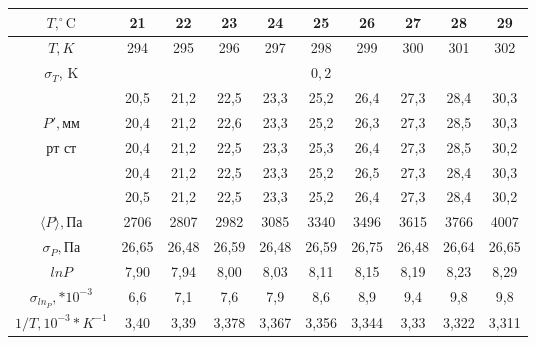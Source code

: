 \documentclass[a4paper,12pt]{article} %
\begin{document}
\begin{tabular}{|c|c|c|c|c|c|c|c|c|c|}
\hline 
$T, ^\circ \text{C}$ & 21 & 22 & 23 & 24 & 25 & 26 & 27 & 28 & 29 \\ 
\hline 
$T, K$ & 294 & 295 & 296 & 297 & 298 & 299 & 300 & 301 & 302 \\ 
\hline 
$\sigma_T$, K & \multicolumn{9}{c|}{$0,2$} \\ 
\hline 
 & 20,5 & 21,2 & 22,5 & 23,3 & 25,2 & 26,4 & 27,3 & 28,4 & 30,3 \\ 
\hhline{~---------} 
$P', \text{мм}$ & 20,4 & 21,2 & 22,6 & 23,3 & 25,2 & 26,3 & 27,3 & 28,5 & 30,3 \\ 
\hhline{~---------}  
$\text{рт ст}$ & 20,4 & 21,2 & 22,5 & 23,3 & 25,3 & 26,4 & 27,3 & 28,5 & 30,2 \\ 
\hhline{~---------} 
 & 20,4 & 21,2 & 22,5 & 23,3 & 25,2 & 26,5 & 27,3 & 28,4 & 30,3 \\ 
\hhline{~---------} 
 & 20,5 & 21,2 & 22,5 & 23,3 & 25,2 & 26,4 & 27,3 & 28,4 & 30,2 \\ 
\hline 
$\langle P \rangle, \text{Па} $ & 2706 & 2807 & 2982 & 3085 & 3340 & 3496 & 3615 & 3766 & 4007 \\ 
\hline 
$\sigma_P, \text{Па}$ & 26,65 & 26,48 & 26,59 & 26,48 & 26,59 & 26,75 & 26,48 & 26,64 & 26,65 \\ 
\hline 
$ln{P}$ & 7,90 & 7,94 & 8,00 & 8,03 & 8,11 & 8,15 & 8,19 & 8,23 & 8,29 \\ 
\hline 
$\sigma_{ln_P}, *10^{-3}$ & 6,6 & 7,1 & 7,6 & 7,9 & 8,6 & 8,9 & 9,4 & 9,8 & 9,8 \\ 
\hline 
$1/T, 10^{-3}*K^{-1}$ & 3,40 & 3,39 & 3,378 & 3,367 & 3,356 & 3,344 & 3,33 & 3,322 & 3,311 \\ 
\hline 
\end{tabular} 

\medskip
\medskip
\medskip
\end{document}
